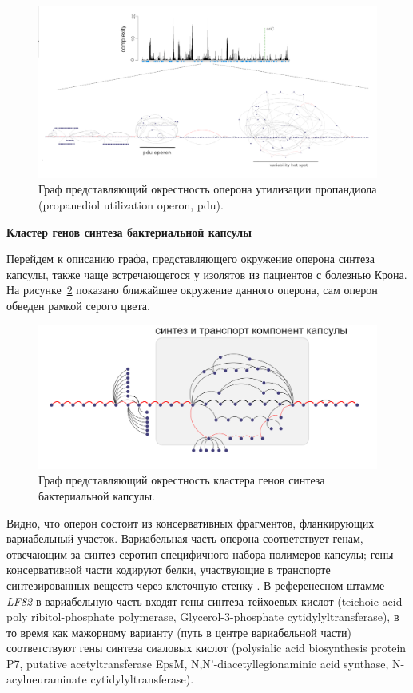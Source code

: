 \begin{figure}[!ht] 
  \center
    \includegraphics[width=\textwidth]{Dissertation/images/subgraphs/subgraph_largest.png}
  \caption{Граф представляющий окрестность оперона утилизации пропандиола (propanediol utilization operon, pdu). }
  \label{img:pdu_wide} 
\end{figure}

\textbf{Кластер генов синтеза бактериальной капсулы}

Перейдем к описанию графа, представляющего окружение оперона синтеза капсулы, также чаще встречающегося у изолятов из пациентов с болезнью Крона. На рисунке~\ref{img:capsule_sub_small} показано ближайшее окружение данного оперона, сам оперон обведен рамкой серого цвета. 

\begin{figure}[!ht] 
  \center
    \includegraphics[width=\textwidth]{Dissertation/images/subgraphs/capsular_subgraph.png}
  \caption{Граф представляющий окрестность кластера генов синтеза бактериальной капсулы. }
  \label{img:capsule_sub_small} 
\end{figure}

Видно, что оперон состоит из консервативных фрагментов, фланкирующих вариабельный участок. Вариабельная часть оперона соответствует генам, отвечающим за синтез серотип-специфичного набора полимеров капсулы; гены консервативной части кодируют белки, участвующие в транспорте синтезированных веществ через клеточную стенку \cite{clarke1999genetic}. В референесном штамме \textit{LF82} в вариабельную часть входят гены синтеза тейхоевых кислот (teichoic acid poly ribitol-phosphate polymerase, Glycerol-3-phosphate cytidylyltransferase), в то время как мажорному варианту (путь в центре вариабельной части) соответствуют гены синтеза сиаловых кислот (polysialic acid biosynthesis protein P7, putative acetyltransferase EpsM, N,N'-diacetyllegionaminic acid synthase, N-acylneuraminate cytidylyltransferase).


